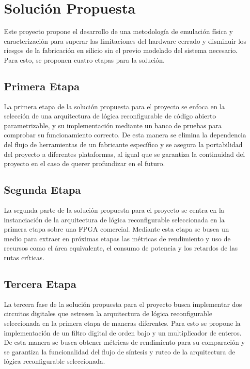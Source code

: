 \chapter{Solución Propuesta}
\label{ch:solucion}

Este proyecto propone el desarrollo de una metodología de emulación física y caracterización para 
superar las limitaciones del hardware cerrado y disminuir los riesgos de la fabricación en 
silicio sin el previo modelado del sistema necesario. 
Para esto, se proponen cuatro etapas para la solución.

\section{Primera Etapa}

La primera etapa de la solución propuesta para el proyecto se enfoca en la selección de 
una arquitectura de lógica reconfigurable de código abierto parametrizable, y su 
implementación mediante un banco de pruebas para comprobar su funcionamiento correcto. De 
esta manera se elimina la dependencia del flujo de herramientas de un fabricante específico 
y se asegura la portabilidad del proyecto a diferentes plataformas, al igual que se garantiza 
la continuidad del proyecto en el caso de querer profundizar en el futuro.

\section{Segunda Etapa}

La segunda parte de la solución propuesta para el proyecto se centra en la instanciación de 
la arquitectura de lógica reconfigurable seleccionada en la primera etapa sobre una FPGA 
comercial. Mediante esta etapa se busca un medio para extraer en próximas etapas las métricas 
de rendimiento y uso de recursos como el área equivalente, el consumo de potencia y los 
retardos de las rutas críticas.

\section{Tercera Etapa}

La tercera fase de la solución propuesta para el proyecto busca implementar dos circuitos 
digitales que estresen la arquitectura de lógica reconfigurable seleccionada en la primera 
etapa de maneras diferentes. Para esto se propone la implementación de un filtro digital 
de orden bajo y un multiplicador de enteros. De esta manera se busca obtener métricas de 
rendimiento para su comparación y se garantiza la funcionalidad del flujo de síntesis y 
ruteo de la arquitectura de lógica reconfigurable seleccionada.

